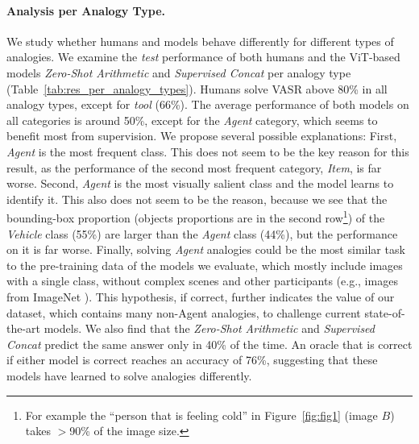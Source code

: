 \documentclass[letterpaper]{article} \usepackage{aaai23}  \usepackage{times}  \usepackage{helvet}  \usepackage{courier}  \usepackage[hyphens]{url}  \usepackage{graphicx} \urlstyle{rm} \def\UrlFont{\rm}  \usepackage{natbib}  \usepackage{caption} \frenchspacing  \setlength{\pdfpagewidth}{8.5in}  \setlength{\pdfpageheight}{11in}  \usepackage{algorithm}
\newcommand{\zeroshot}[0]{\emph{Zero-Shot Arithmetic}}
\newcommand{\trainedconcat}[0]{\emph{Supervised Concat}}
\begin{document}
\paragraph{Analysis per Analogy Type.} We study whether humans and models behave differently for different types of analogies. We examine the \textit{test} performance of both humans and the ViT-based models \zeroshot{} and \trainedconcat{} per analogy type (Table~\ref{tab:res_per_analogy_types}). Humans solve VASR above 80\% in all analogy types, except for \emph{tool} (66\%). 
The average performance of both models on all categories is around 50\%, except for the \emph{Agent} category, which seems to benefit most from supervision. We propose several possible explanations: First, \emph{Agent} is the most frequent class. This does not seem to be the key reason for this result, as the performance of the second most frequent category, \emph{Item}, is far worse. Second, \emph{Agent} is the most visually salient class and the model learns to identify it. This also does not seem to be the reason, because we see that the bounding-box proportion (objects proportions are in the second row\footnote{For example the ``person that is feeling cold'' in Figure~\ref{fig:fig1} (image $B$) takes $>$90\% of the image size.}) of the \emph{Vehicle} class (55\%) are larger than the \emph{Agent} class (44\%), but the performance on it is far worse. Finally, solving \emph{Agent} analogies could be the most similar task to the pre-training data of the models we evaluate, which mostly include images with a single class, without complex scenes and other participants (e.g., images from ImageNet \cite{deng2009imagenet}). This hypothesis, if correct, further indicates the value of our dataset, which contains many non-Agent analogies, to challenge current state-of-the-art models. We also find that the \zeroshot{} and \trainedconcat{} predict the same answer only in 40\% of the time. An oracle that is correct if either model is correct reaches an accuracy of 76\%, suggesting that these models have learned to solve analogies differently.
\end{document}
